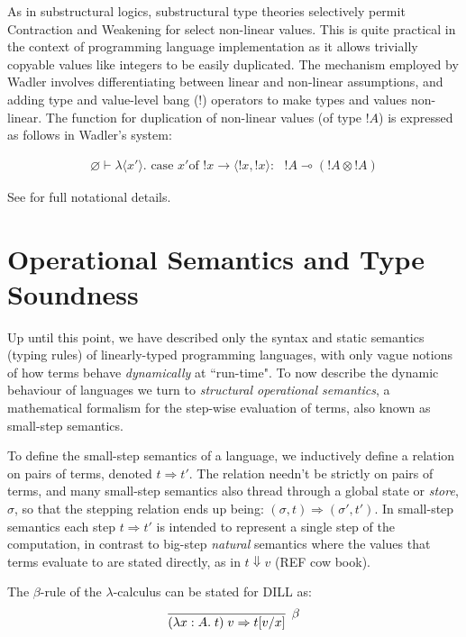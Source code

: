\documentclass[]{unswthesis}
\newcommand{\case}{\text{ case }}
\newcommand{\of}{\text{of }}
\newcommand{\yields}{\multimap}
\newcommand{\steps}{\Rightarrow}
\let\i\textit
\begin{document}
As in substructural logics, substructural type theories selectively permit Contraction and Weakening for select non-linear values. This is quite practical in the context of programming language implementation as it allows trivially copyable values like integers to be easily duplicated. The mechanism employed by Wadler \cite{wadler93} involves differentiating between linear and non-linear assumptions, and adding type and value-level bang (!) operators to make types and values non-linear. The function for duplication of non-linear values (of type $!A$) is expressed as follows in Wadler's system:

\begin{eqnarray*}
\varnothing \vdash \lambda \langle x' \rangle . \case x' \of !x \rightarrow \langle !x, !x\rangle :\text{ } !A \yields (!A \otimes !A)
\end{eqnarray*}

See \cite{wadler93} for full notational details.

\section{Operational Semantics and Type Soundness}

Up until this point, we have described only the syntax and static semantics (typing rules) of linearly-typed programming languages, with only vague notions of how terms behave \i{dynamically} at ``run-time". To now describe the dynamic behaviour of languages we turn to \i{structural operational semantics}, a mathematical formalism for the step-wise evaluation of terms, also known as small-step semantics.

To define the small-step semantics of a language, we inductively define a relation on pairs of terms, denoted $t \steps t'$. The relation needn't be strictly on pairs of terms, and many small-step semantics also thread through a global state or \i{store}, $\sigma$, so that the stepping relation ends up being: $(\sigma, t) \steps (\sigma', t')$. In small-step semantics each step $t \steps t'$ is intended to represent a single step of the computation, in contrast to big-step \i{natural} semantics where the values that terms evaluate to are stated directly, as in $t \Downarrow v$ (REF cow book).

The $\beta$-rule of the $\lambda$-calculus can be stated for DILL as:
\begin{eqnarray*}
\infer[\beta]{(\lambda x : A. \; t) \; v \steps t[v/x]}{}
\end{eqnarray*}
\end{document}

